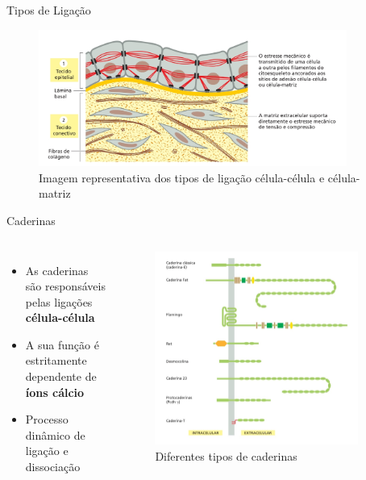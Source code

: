 \documentclass[aspectratio=169]{beamer}
\begin{document}
\begin{frame}{Tipos de Ligação}
    \begin{figure}\label{fig:ligacao_geral}
        \includegraphics[width=0.9\textwidth]{img/bio/tipos_ligação.jpg}
        \caption{Imagem representativa dos tipos de ligação célula-célula e célula-matriz}
    \end{figure}
\end{frame}


\begin{frame}{Caderinas}
    \begin{columns}[c, onlytextwidth]
            \begin{itemize}
               \item As caderinas são responsáveis pelas ligações \textbf{célula-célula}
               \item A sua função é estritamente dependente de \textbf{íons cálcio}
               \item Processo dinâmico de ligação e dissociação
            \end{itemize}
        
            \begin{figure}\label{fig:caderinas}
                \includegraphics[width=0.9\textwidth]{img/bio/caderinas.jpg}
                \caption{Diferentes tipos de caderinas}
            \end{figure}
    \end{columns}
\end{frame}
\end{document}
